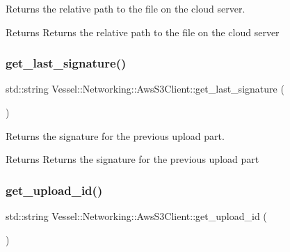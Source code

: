 Returns the relative path to the file on the cloud server. 

\begin{DoxyReturn}{Returns}
Returns the relative path to the file on the cloud server 
\end{DoxyReturn}
\mbox{\label{class_vessel_1_1_networking_1_1_aws_s3_client_ad606a5dd675054cbf1598d662ff90443}} 
\subsubsection{\texorpdfstring{get\+\_\+last\+\_\+signature()}{get\_last\_signature()}}
{\footnotesize\ttfamily std\+::string Vessel\+::\+Networking\+::\+Aws\+S3\+Client\+::get\+\_\+last\+\_\+signature (\begin{DoxyParamCaption}{ }\end{DoxyParamCaption})}



Returns the signature for the previous upload part. 

\begin{DoxyReturn}{Returns}
Returns the signature for the previous upload part 
\end{DoxyReturn}
\mbox{\label{class_vessel_1_1_networking_1_1_aws_s3_client_af255a5ea67ccd234e90518d149737603}} 
\subsubsection{\texorpdfstring{get\+\_\+upload\+\_\+id()}{get\_upload\_id()}}
{\footnotesize\ttfamily std\+::string Vessel\+::\+Networking\+::\+Aws\+S3\+Client\+::get\+\_\+upload\+\_\+id (\begin{DoxyParamCaption}{ }\end{DoxyParamCaption})}



